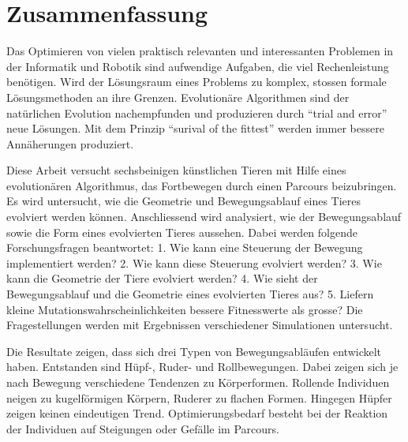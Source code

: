 %
%


\chapter{Zusammenfassung}

  Das Optimieren von vielen praktisch relevanten und interessanten Problemen
  in der Informatik und Robotik sind aufwendige Aufgaben, die viel Rechenleistung benötigen.
  Wird der Lösungsraum eines Problems zu komplex, stossen formale Lösungsmethoden an ihre Grenzen.
  Evolutionäre Algorithmen sind der natürlichen Evolution nachempfunden und
  produzieren durch ``trial and error'' neue Lösungen.
  Mit dem Prinzip ``surival of the fittest'' werden immer bessere Annäherungen produziert.

  \smallskip

  Diese Arbeit versucht sechsbeinigen künstlichen Tieren mit Hilfe eines evolutionären Algorithmus,
  das Fortbewegen durch einen Parcours beizubringen.
  Es wird untersucht, wie die Geometrie und Bewegungsablauf eines Tieres evolviert werden können.
  Anschliessend wird analysiert, wie der Bewegungsablauf sowie die Form eines evolvierten Tieres aussehen.
  Dabei werden folgende Forschungsfragen beantwortet:
  1. Wie kann eine Steuerung der Bewegung implementiert werden?
  2. Wie kann diese Steuerung evolviert werden?
  3. Wie kann die Geometrie der Tiere evolviert werden?
  4. Wie sieht der Bewegungsablauf und die Geometrie eines evolvierten Tieres aus?
  5. Liefern kleine Mutationswahrscheinlichkeiten bessere Fitnesswerte als grosse?
  Die Fragestellungen werden mit Ergebnissen verschiedener Simulationen untersucht.

  \smallskip

  Die Resultate zeigen, dass sich drei Typen von Bewegungsabläufen entwickelt haben.
  Entstanden sind Hüpf-, Ruder- und Rollbewegungen.
  Dabei zeigen sich je nach Bewegung verschiedene Tendenzen zu Körperformen.
  Rollende Individuen neigen zu kugelförmigen Körpern, Ruderer zu flachen Formen.
  Hingegen Hüpfer zeigen keinen eindeutigen Trend.
  Optimierungsbedarf besteht bei der Reaktion der Individuen auf Steigungen oder Gefälle im Parcours.
